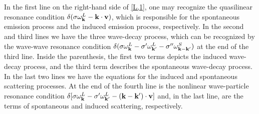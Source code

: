 \documentclass[12pt,a4paper,ruledheader]{report}
\begin{document}
In the first line on the right-hand side of \eqref{L,1}, one may recognize
the quasilinear resonance condition $\delta(\sigma\omega_{\bf k}^L
-{\bf k}\cdot{\bf v})$, which is responsible for the spontaneous
emission process and the induced emission process, respectively.
In the second and third lines we have the three wave-decay process,
which can be recognized by the wave-wave resonance condition 
$\delta(\sigma\omega_{\bf k}^L-\sigma '\omega_{{\bf k}'}^L
-\sigma ''\omega_{{\bf k}-{\bf k}'}^S)$ at the end of the third line.
Inside the parenthesis, the first two terms depicts the induced
wave-decay process, and the third term describes the spontaneous
wave-decay process. In the last two lines we have the equations
for the induced and spontaneous scattering processes. At the end
of the fourth line is the nonlinear wave-particle resonance
condition $\delta[\sigma\omega_{\bf k}^L-\sigma '\omega_{{\bf k}'}^L
-({\bf k}-{\bf k}')\cdot{\bf v}]$  and, in the last line, are the
terms of spontaneous and induced scattering, respectively.
\end{document}
